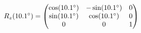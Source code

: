 \documentclass[preview]{standalone}
\begin{document}
\begin{align*}
\special{dvisvgm:raw <g id='unique000'>}R_z(10.1^\circ) = \begin{pmatrix} \cos(10.1^\circ) & -\sin(10.1^\circ) & 0 \\ \sin(10.1^\circ) & \cos(10.1^\circ) & 0 \\ 0 & 0 & 1 \end{pmatrix}\special{dvisvgm:raw </g>}
\end{align*}
\end{document}
